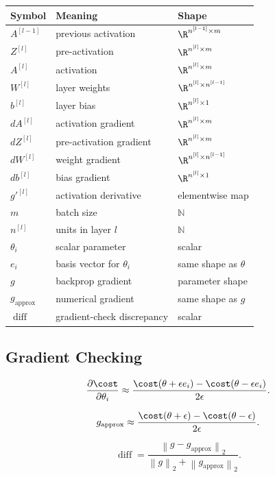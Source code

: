 \begin{center}
\begin{tabular}{lll}
\toprule
Symbol & Meaning & Shape \\
\midrule
$A^{[l-1]}$ & previous activation & $\R^{n^{[l-1]} \times m}$ \\
$Z^{[l]}$ & pre-activation & $\R^{n^{[l]} \times m}$ \\
$A^{[l]}$ & activation & $\R^{n^{[l]} \times m}$ \\
$W^{[l]}$ & layer weights & $\R^{n^{[l]} \times n^{[l-1]}}$ \\
$b^{[l]}$ & layer bias & $\R^{n^{[l]} \times 1}$ \\
$dA^{[l]}$ & activation gradient & $\R^{n^{[l]} \times m}$ \\
$dZ^{[l]}$ & pre-activation gradient & $\R^{n^{[l]} \times m}$ \\
$dW^{[l]}$ & weight gradient & $\R^{n^{[l]} \times n^{[l-1]}}$ \\
$db^{[l]}$ & bias gradient & $\R^{n^{[l]} \times 1}$ \\
$g'^{[l]}$ & activation derivative & elementwise map \\
$m$ & batch size & $\mathbb{N}$ \\
$n^{[l]}$ & units in layer $l$ & $\mathbb{N}$ \\
$\theta_i$ & scalar parameter & scalar \\
$e_i$ & basis vector for $\theta_i$ & same shape as $\theta$ \\
$g$ & backprop gradient & parameter shape \\
$g_{\mathrm{approx}}$ & numerical gradient & same shape as $g$ \\
$\operatorname{diff}$ & gradient-check discrepancy & scalar \\
\bottomrule
\end{tabular}
\end{center}

\subsection{Gradient Checking}

\[
\frac{\partial \cost}{\partial \theta_i}
\approx
\frac{
\cost(\theta+\epsilon e_i)
-
\cost(\theta-\epsilon e_i)
}{
2\epsilon
}.
\]

\[
g_{\mathrm{approx}}
\approx
\frac{
\cost(\theta+\epsilon)
-
\cost(\theta-\epsilon)
}{
2\epsilon
}.
\]

\[
\operatorname{diff}
=
\frac{
\left\lVert g-g_{\mathrm{approx}}\right\rVert_2
}{
\left\lVert g\right\rVert_2
+
\left\lVert g_{\mathrm{approx}}\right\rVert_2
}.
\]
